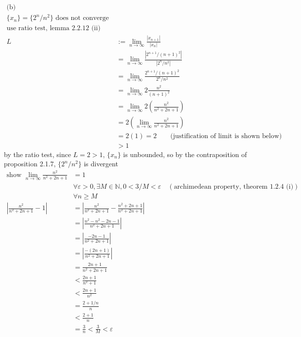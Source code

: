 \documentclass[12pt, border = 4pt, multi]{article} %
\begin{document}
\\
\\
\begin{align*}
\text{(b)} \hspace{14em}&\\
\{x_n\} = \{2 ^ n / n ^ 2\} \text{ does not converge}&\\
\text{use ratio test, lemma 2.2.12 (ii)}&\\
L &:= \lim_{n \rightarrow \infty} \frac{|x_{n + 1}|}{|x_n|}\\
&= \lim_{n \rightarrow \infty} \frac{|2 ^ {n + 1} / (n + 1) ^ 2|}{|2 ^ n / n ^ 2|}\\
&= \lim_{n \rightarrow \infty} \frac{2 ^ {n + 1} / (n + 1) ^ 2}{2 ^ n / n ^ 2}\\
&= \lim_{n \rightarrow \infty} 2\frac{n ^ 2}{(n + 1) ^ 2}\\
&= \lim_{n \rightarrow \infty} 2\left(\frac{n ^ 2}{n ^ 2 + 2n + 1}\right)\\
&= 2\left(\lim_{n \rightarrow \infty}\frac{n ^ 2}{n ^ 2 + 2n + 1}\right)\\
&= 2(1) = 2 \qquad \text{(justification of limit is shown below)}\\
&> 1
\end{align*}
by the ratio test, since $L = 2 > 1$, $\{x_n\}$ is unbounded, so by the contraposition of proposition 2.1.7, $\{2 ^ n / n ^ 2\}$ is divergent\\
\begin{align*}
\text{show }\lim_{n \rightarrow \infty} \frac{n ^ 2}{n ^ 2 + 2n + 1} &= 1\\
&\forall \varepsilon > 0, \exists M \in \mathbb{N}, 0 < 3 / M < \varepsilon \quad(\text{archimedean property, theorem 1.2.4 (i)})\\
&\forall n \geq M\\
\left|\frac{n ^ 2}{n ^ 2 + 2n + 1} - 1\right| &= \left|\frac{n ^ 2}{n ^ 2 + 2n + 1} - \frac{n ^ 2 + 2n + 1}{n ^ 2 + 2n + 1}\right|\\
&= \left|\frac{n ^ 2 - n ^ 2 - 2n - 1}{n ^ 2 + 2n + 1}\right|\\
&= \left|\frac{-2n - 1}{n ^ 2 + 2n + 1}\right|\\
&= \left|\frac{-(2n + 1)}{n ^ 2 + 2n + 1}\right|\\
&= \frac{2n + 1}{n ^ 2 + 2n + 1}\\
&< \frac{2n + 1}{n ^ 2 + 1}\\
&< \frac{2n + 1}{n ^ 2}\\
&= \frac{2 + 1 / n}{n}\\
&< \frac{2 + 1}{n}\\
&= \frac{3}{n} < \frac{3}{M} < \varepsilon
\end{align*}
\end{document}

